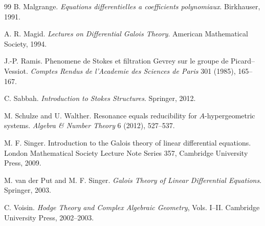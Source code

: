 \documentclass[11pt]{article}
\begin{document}
\begin{thebibliography}{99}
B. Malgrange.
\newblock \emph{Equations differentielles a coefficients polynomiaux}.
\newblock Birkhauser, 1991.

A. R. Magid.
\newblock \emph{Lectures on Differential Galois Theory}.
\newblock American Mathematical Society, 1994.

J.-P. Ramis.
\newblock Phenomene de Stokes et filtration Gevrey sur le groupe de Picard--Vessiot.
\newblock \emph{Comptes Rendus de l'Academie des Sciences de Paris} 301 (1985), 165--167.

C. Sabbah.
\newblock \emph{Introduction to Stokes Structures}.
\newblock Springer, 2012.

M. Schulze and U. Walther.
\newblock Resonance equals reducibility for \(A\)-hypergeometric systems.
\newblock \emph{Algebra \& Number Theory} 6 (2012), 527--537.

M. F. Singer.
\newblock Introduction to the Galois theory of linear differential equations.
\newblock London Mathematical Society Lecture Note Series 357, Cambridge University Press, 2009.

M. van der Put and M. F. Singer.
\newblock \emph{Galois Theory of Linear Differential Equations}.
\newblock Springer, 2003.

C. Voisin.
\newblock \emph{Hodge Theory and Complex Algebraic Geometry}, Vols. I--II.
\newblock Cambridge University Press, 2002--2003.

\end{thebibliography}
\end{document}
